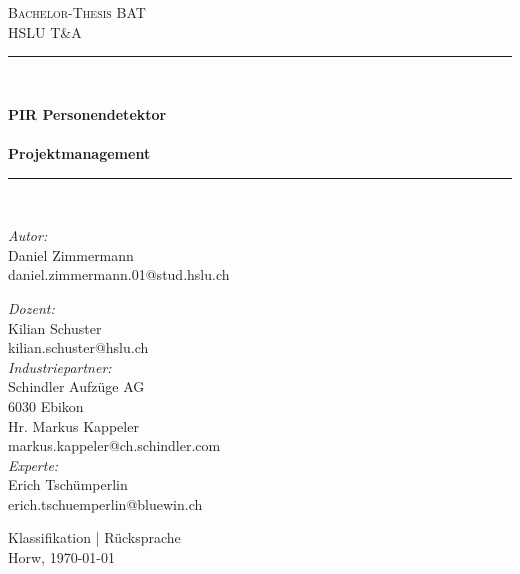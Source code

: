 \begin{titlepage}	
	\begin{center}	
		
		\textsc{\LARGE Bachelor-Thesis BAT }\\[1.5cm]
		
		\textsc{\Large HSLU T\&A}\\[0.5cm]
		\vfill
		
		
		\newcommand{\HRule}{\rule{\linewidth}{0.5mm}}
		\HRule \\[0.4cm]
		{   \Huge \bfseries PIR Personendetektor\\
			~\\
			\large Projektmanagement\\[0.2cm]
			
			\HRule \\[1cm]
		}
		\begingroup
		\parfillskip=0pt
		\large
		
		\begin{minipage}[t]{0.48\textwidth}
			\raggedright						
			\emph{Autor:}\\
			Daniel Zimmermann\\
			daniel.zimmermann.01@stud.hslu.ch\\
		\end{minipage}%
		\hfill
		\begin{minipage}[t]{0.48\textwidth}
			\raggedleft
			\emph{Dozent:} \\
			Kilian Schuster \\
			kilian.schuster@hslu.ch\\
			\hfill\break
			\emph{Industriepartner:} \\
			Schindler Aufzüge AG \\
			6030 Ebikon\\
			Hr. Markus Kappeler \\
			markus.kappeler@ch.schindler.com\\
			\hfill\break
			\emph{Experte:}\\
			Erich Tschümperlin\\
			erich.tschuemperlin@bluewin.ch\\
		\end{minipage}%
		\par\endgroup
		
		\vfill
		{\large Klassifikation | Rücksprache\\ 
			Horw, 
			\today}	
	\end{center}	
\end{titlepage}

